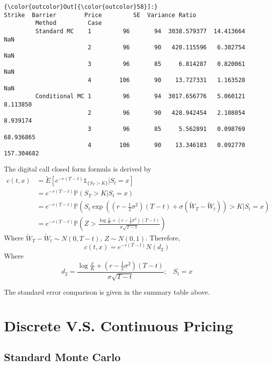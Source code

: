 \documentclass[11pt]{article}
\begin{document}
            \begin{Verbatim}[commandchars=\\\{\}]
{\color{outcolor}Out[{\color{outcolor}58}]:}                      Strike  Barrier        Price         SE  Variance Ratio
         Method         Case                                                         
         Standard MC    1         96       94  3038.579377  14.413664             NaN
                        2         96       90   420.115596   6.302754             NaN
                        3         96       85     6.814287   0.820061             NaN
                        4        106       90    13.727331   1.163528             NaN
         Conditional MC 1         96       94  3017.656776   5.060121        8.113850
                        2         96       90   428.942454   2.108054        8.939174
                        3         96       85     5.562891   0.098769       68.936865
                        4        106       90    13.346183   0.092770      157.304682
\end{Verbatim}
        
    The digital call closed form formula is derived by \[
\begin{split}
c(t,x) &= \tilde{E}[e^{-r(T-t)}\mathbb{1}_{\{S_T > K\}} | S_t = x] \\
& = e^{-r(T-t)}\mathbb{P}(S_T > K | S_t = x) \\
& = e^{-r(T-t)}\mathbb{P}\left(S_t \exp\left((r-\frac{1}{2}\sigma^2)(T-t)+\sigma(\tilde{W}_T - \tilde{W}_t)\right) > K \Big| S_t = x\right) \\
&= e^{-r(T-t)}\mathbb{P}\left(Z > \frac{\log\frac{x}{K}+(r-\frac{1}{2}\sigma^2)(T-t)}{\sigma\sqrt{T-t}}\right)
\end{split}
\] Where \(\tilde{W}_T - \tilde{W}_t\sim N(0,T-t)\), \(Z\sim N(0, 1)\).
Therefore, \[
c(t,x) = e^{-r(T-t)}N(d_2)
\] Where \[
d_2 = \frac{\log\frac{x}{K}+(r-\frac{1}{2}\sigma^2)(T-t)}{\sigma\sqrt{T-t}};~~~~S_t=x
\]

The standard error comparison is given in the summary table above.

    \section{Discrete V.S. Continuous
Pricing}\label{discrete-v.s.-continuous-pricing}

    \subsection{Standard Monte Carlo}\label{standard-monte-carlo}
\end{document}
